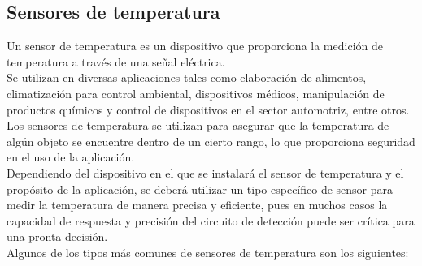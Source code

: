 	\subsection{Sensores de temperatura}
	Un sensor de temperatura es un dispositivo que proporciona la medición de temperatura a través de una señal eléctrica. \\
		
	Se utilizan en diversas aplicaciones tales como elaboración de alimentos, climatización para control ambiental, dispositivos médicos, manipulación de productos químicos y control de dispositivos en el sector automotriz, entre otros. \\
		
	Los sensores de temperatura se utilizan para asegurar que la temperatura de algún objeto se encuentre dentro de un cierto rango, lo que proporciona seguridad en el uso de la aplicación. \\
		
	Dependiendo del dispositivo en el que se instalará el sensor de temperatura y el propósito de la aplicación, se deberá utilizar un tipo específico de sensor para medir la temperatura de manera precisa y eficiente, pues en muchos casos la capacidad de respuesta y precisión del circuito de detección puede ser crítica para una pronta decisión.\\
	
	Algunos de los tipos más comunes de sensores de temperatura son los siguientes:
	
